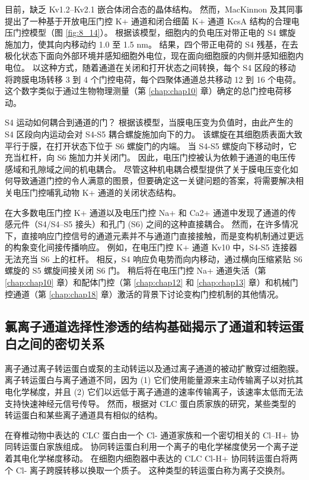 目前，缺乏 Kv1.2–Kv2.1 嵌合体闭合态的晶体结构。 然而，MacKinnon 及其同事提出了一种基于开放电压门控 K+ 通道和闭合细菌 K+ 通道 KcsA 结构的合理电压门控模型（图 \ref{fig:8_14}）。 
根据该模型，细胞内的负电压对带正电的 S4 螺旋施加力，使其向内移动约 1.0 至 1.5 nm。 
结果，四个带正电荷的 S4 残基，在去极化状态下面向外部环境并感知细胞外电位，现在面向细胞膜的内侧并感知细胞内电位。 
以这种方式，随着通道在关闭和打开状态之间转换，每个 S4 区段的移动将跨膜电场转移 3 到 4 个门控电荷，每个四聚体通道总共移动 12 到 16 个电荷。 
这个数字类似于通过生物物理测量（第 \ref{chap:chap10} 章）确定的总门控电荷移动。


S4 运动如何耦合到通道的门？ 
根据该模型，当膜电压变为负值时，由此产生的 S4 区段向内运动会对 S4-S5 耦合螺旋施加向下的力。 
该螺旋在其细胞质表面大致平行于膜，在打开状态下位于 S6 螺旋门的内端。 
当 S4-S5 螺旋向下移动时，它充当杠杆，向 S6 施加力并关闭门。 
因此，电压门控被认为依赖于通道的电压传感域和孔隙域之间的机电耦合。 
尽管这种机电耦合模型提供了关于膜电压变化如何导致通道门控的令人满意的图景，但要确定这一关键问题的答案，将需要解决相关电压门控哺乳动物 K+ 通道的关闭状态结构。


在大多数电压门控 K+ 通道以及电压门控 Na+ 和 Ca2+ 通道中发现了通道的传感元件（S4/S4–S5 接头）和孔门 (S6) 之间的这种直接耦合。 
然而，在许多情况下，直接响应门控信号的通道元素并不与通道门直接接触，而是变构机制通过更远的构象变化间接传播响应。 
例如，在电压门控 K+ 通道 Kv10 中，S4-S5 连接器无法充当 S6 上的杠杆。 
相反，S4 响应负电势而向内移动，通过横向压缩紧贴 S6 螺旋的 S5 螺旋间接关闭 S6 门。 
稍后将在电压门控 Na+ 通道失活（第 \ref{chap:chap10} 章）和配体门控（第 \ref{chap:chap12} 和 \ref{chap:chap13} 章）和机械门控通道（第 \ref{chap:chap18} 章）激活的背景下讨论变构门控机制的其他情况。


\subsection{氯离子通道选择性渗透的结构基础揭示了通道和转运蛋白之间的密切关系}
离子通过离子转运蛋白或泵的主动转运以及通过离子通道的被动扩散穿过细胞膜。 
离子转运蛋白与离子通道不同，因为 (1) 它们使用能量源来主动传输离子以对抗其电化学梯度，并且 (2) 它们以远低于离子通道的速率传输离子，该速率太低而无法支持快速神经元信号传导。 
然而，根据对 CLC 蛋白质家族的研究，某些类型的转运蛋白和某些离子通道具有相似的结构。


在脊椎动物中表达的 CLC 蛋白由一个 Cl- 通道家族和一个密切相关的 Cl--H+ 协同转运蛋白家族组成。 
协同转运蛋白利用一个离子的电化学梯度使另一个离子逆着其电化学梯度移动。 
在细胞内细胞器中表达的 CLC Cl-H+ 协同转运蛋白将两个 Cl- 离子跨膜转移以换取一个质子。 
这种类型的转运蛋白称为离子交换剂。


